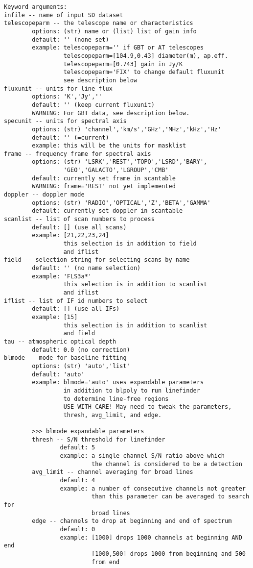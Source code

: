 \begin{verbatim}
Keyword arguments:
infile -- name of input SD dataset
telescopeparm -- the telescope name or characteristics
        options: (str) name or (list) list of gain info
        default: '' (none set)
        example: telescopeparm='' if GBT or AT telescopes
                 telescopeparm=[104.9,0.43] diameter(m), ap.eff.
                 telescopeparm=[0.743] gain in Jy/K
                 telescopeparm='FIX' to change default fluxunit
                 see description below
fluxunit -- units for line flux
        options: 'K','Jy',''
        default: '' (keep current fluxunit)
        WARNING: For GBT data, see description below.
specunit -- units for spectral axis
        options: (str) 'channel','km/s','GHz','MHz','kHz','Hz'
        default: '' (=current)
        example: this will be the units for masklist
frame -- frequency frame for spectral axis
        options: (str) 'LSRK','REST','TOPO','LSRD','BARY',
                 'GEO','GALACTO','LGROUP','CMB'
        default: currently set frame in scantable
        WARNING: frame='REST' not yet implemented
doppler -- doppler mode
        options: (str) 'RADIO','OPTICAL','Z','BETA','GAMMA'
        default: currently set doppler in scantable
scanlist -- list of scan numbers to process
        default: [] (use all scans)
        example: [21,22,23,24]
                 this selection is in addition to field
                 and iflist
field -- selection string for selecting scans by name
        default: '' (no name selection)
        example: 'FLS3a*'
                 this selection is in addition to scanlist
                 and iflist
iflist -- list of IF id numbers to select
        default: [] (use all IFs)
        example: [15]
                 this selection is in addition to scanlist
                 and field
tau -- atmospheric optical depth
        default: 0.0 (no correction)
blmode -- mode for baseline fitting
        options: (str) 'auto','list'
        default: 'auto'
        example: blmode='auto' uses expandable parameters
                 in addition to blpoly to run linefinder
                 to determine line-free regions
                 USE WITH CARE! May need to tweak the parameters,
                 thresh, avg_limit, and edge.

        >>> blmode expandable parameters
        thresh -- S/N threshold for linefinder
                default: 5
                example: a single channel S/N ratio above which 
                         the channel is considered to be a detection
        avg_limit -- channel averaging for broad lines
                default: 4
                example: a number of consecutive channels not greater 
                         than this parameter can be averaged to search for 
                         broad lines
        edge -- channels to drop at beginning and end of spectrum
                default: 0
                example: [1000] drops 1000 channels at beginning AND end
                         [1000,500] drops 1000 from beginning and 500 
                         from end


\end{verbatim}
